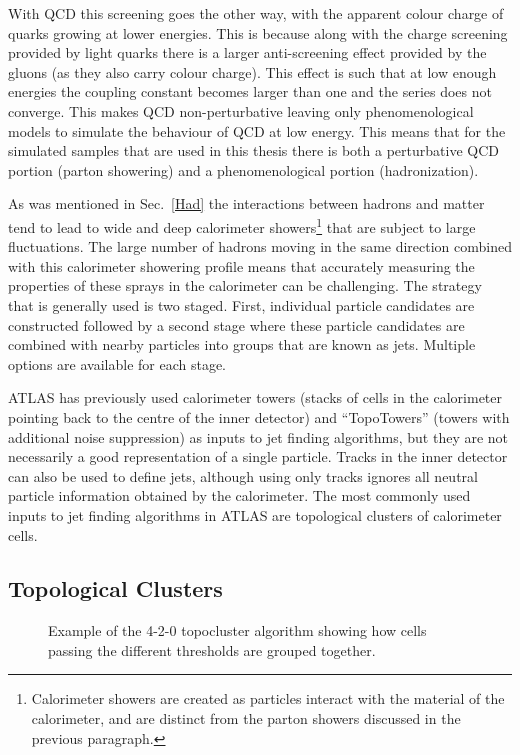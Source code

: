 With QCD this screening goes the other way, with the apparent colour charge of quarks growing at lower energies.  
This is because along with the charge screening provided by light quarks there is a larger anti-screening effect provided by the gluons (as they also carry colour charge).  
This effect is such that at low enough energies the coupling constant becomes larger than one and the series does not converge.  
This makes QCD non-perturbative leaving only phenomenological models to simulate the behaviour of QCD at low energy.  
This means that for the simulated samples that are used in this thesis there is both a perturbative QCD portion (parton showering) and a phenomenological portion (hadronization).  

As was mentioned in Sec.~\ref{Had} the interactions between hadrons and matter tend to lead to wide and deep calorimeter showers\footnote{Calorimeter showers are created as particles interact with the material of the calorimeter, and are distinct from the parton showers discussed in the previous paragraph. } that are subject to large fluctuations.  
The large number of hadrons moving in the same direction combined with this calorimeter showering profile means that accurately measuring the properties of these sprays in the calorimeter can be challenging.  
The strategy that is generally used is two staged.  
First, individual particle candidates are constructed followed by a second stage where these particle candidates are combined with nearby particles into groups that are known as jets.  
Multiple options are available for each stage.  

ATLAS has previously used calorimeter towers (stacks of cells in the calorimeter pointing back to the centre of the inner detector) and ``TopoTowers'' (towers with additional noise suppression) as inputs to jet finding algorithms, but they are not necessarily a good representation of a single particle.  
Tracks in the inner detector can also be used to define jets, although using only tracks ignores all neutral particle information obtained by the calorimeter.  
The most commonly used inputs to jet finding algorithms in ATLAS are topological clusters of calorimeter cells.  
 
\subsection{Topological Clusters}
\label{Sec:Topocluster}
\begin{figure}[!ht]
  \begin{center}
  \end{center}
  \caption[Topoclustering diagram]
  {\small Example of the 4-2-0 topocluster algorithm showing how cells passing the different thresholds are grouped together.  }
\end{figure}


